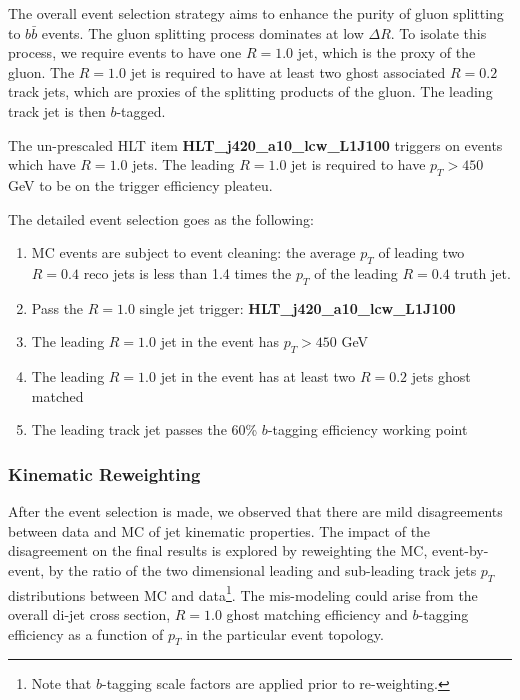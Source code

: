 
\label{sec:gbb-eventselection}

The overall event selection strategy aims to enhance the purity of gluon splitting to $b \bar b$ events. The gluon splitting process dominates at low $\Delta R$. To isolate this process, we require events to have one $R=1.0$ jet, which is the proxy of the gluon. The $R=1.0$ jet is required to have at least two ghost associated $R=0.2$ track jets, which are proxies of the splitting products of the gluon. The leading track jet is then $b$-tagged. 

The un-prescaled HLT item \textbf{HLT\_j420\_a10\_lcw\_L1J100} triggers on events which have $R=1.0$ jets. The leading $R=1.0$ jet is required to have $p_T>450$ GeV to be on the trigger efficiency pleateu. 

The detailed event selection goes as the following:
\begin{enumerate}
	\item MC events are subject to event cleaning: the average $p_T$ of leading two $R=0.4$ reco jets is less than 1.4 times the $p_T$ of the leading $R=0.4$ truth jet. 
	\item Pass the $R=1.0$ single jet trigger: \textbf{HLT\_j420\_a10\_lcw\_L1J100}
	\item The leading $R=1.0$ jet in the event has $p_T>450$ GeV
        \item The leading $R=1.0$ jet in the event has at least two $R=0.2$ jets ghost matched
	\item The leading track jet passes the 60\% $b$-tagging efficiency working point
\end{enumerate}


\subsubsection{Kinematic Reweighting}

After the event selection is made, we observed that there are mild disagreements between data and MC of jet kinematic properties. The impact of the disagreement on the final results is explored by reweighting the MC, event-by-event, by the ratio of the two dimensional leading and sub-leading track jets $p_T$ distributions between MC and data\footnote {Note that $b$-tagging scale factors are applied prior to re-weighting.}. The mis-modeling could arise from the overall di-jet cross section, $R=1.0$ ghost matching efficiency and $b$-tagging efficiency as a function of $p_T$ in the particular event topology.


